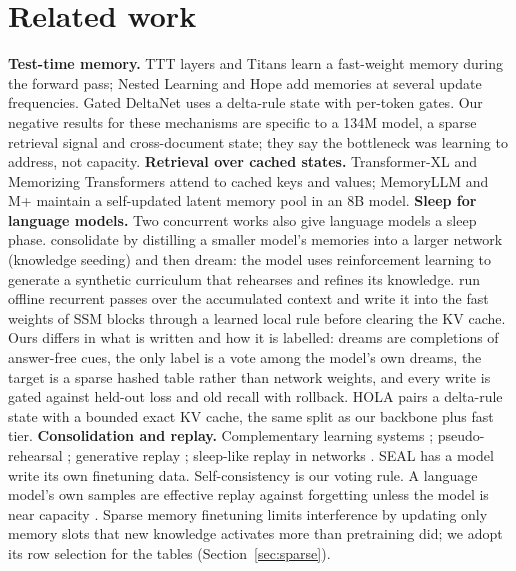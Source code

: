 \documentclass[11pt]{article}
\begin{document}
\section{Related work}
\textbf{Test-time memory.} TTT layers \citep{sun2024ttt} and Titans
\citep{behrouz2025titans} learn a fast-weight memory during the forward pass;
Nested Learning and Hope \citep{behrouz2025nested} add memories at several
update frequencies. Gated DeltaNet \citep{yang2025gdn} uses a delta-rule
state with per-token gates. Our negative results for these mechanisms are
specific to a 134M model, a sparse retrieval signal and cross-document state;
they say the bottleneck was learning to address, not capacity.
\textbf{Retrieval over cached states.} Transformer-XL \citep{dai2019transformerxl}
and Memorizing Transformers \citep{wu2022memorizing} attend to cached keys and
values; MemoryLLM and M+ \citep{wang2024memoryllm,wang2025mplus} maintain a
self-updated latent memory pool in an 8B model.
\textbf{Sleep for language models.} Two concurrent works also give language
models a sleep phase. \citet{behrouz2026sleep} consolidate by distilling a
smaller model's memories into a larger network (knowledge seeding) and then
dream: the model uses reinforcement learning to generate a synthetic curriculum
that rehearses and refines its knowledge. \citet{lee2026sleep} run offline
recurrent passes over the accumulated context and write it into the fast
weights of SSM blocks through a learned local rule before clearing the KV cache.
Ours differs in what is written and how it is labelled: dreams are completions
of answer-free cues, the only label is a vote among the model's own dreams, the
target is a sparse hashed table rather than network weights, and every write is
gated against held-out loss and old recall with rollback. HOLA
\citep{cui2026hola} pairs a delta-rule state with a bounded exact KV cache, the
same split as our backbone plus fast tier.
\textbf{Consolidation and replay.} Complementary learning systems
\citep{mcclelland1995cls}; pseudo-rehearsal \citep{robins1995pseudo};
generative replay \citep{shin2017generative}; sleep-like replay in networks
\citep{tadros2022sleep}. SEAL \citep{zweiger2025seal} has a model write its
own finetuning data. Self-consistency \citep{wang2023selfconsistency} is our
voting rule. A language model's own samples are effective replay against
forgetting unless the model is near capacity \citep{marek2026forgetting}.
Sparse memory finetuning \citep{lin2025sparsememft} limits interference by
updating only memory slots that new knowledge activates more than pretraining
did; we adopt its row selection for the tables (Section~\ref{sec:sparse}).
\end{document}
